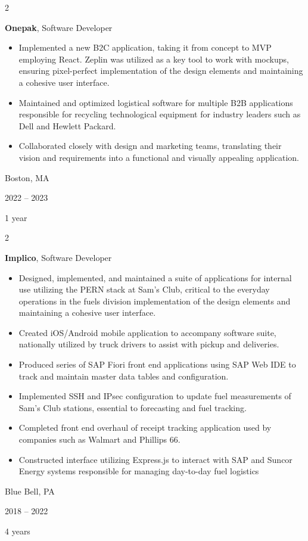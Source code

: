 \documentclass[10pt, letterpaper]{article}
\newenvironment{highlights}{
    \begin{itemize}[
        topsep=0.10 cm,
        parsep=0.10 cm,
        partopsep=0pt,
        itemsep=0pt,
        leftmargin=0.4 cm + 10pt
    ]
}{
    \end{itemize}
} %
\newenvironment{twocolentry}[2][]{
    \onecolentry
    \def\secondColumn{#2}
    \setcolumnwidth{\fill, 4.5 cm}
    \begin{paracol}{2}
}{
    \switchcolumn \raggedleft \secondColumn
    \end{paracol}
    \endonecolentry
} %
\begin{document}
        \begin{twocolentry}{
            Boston, MA

        2022 – 2023

        1 year
        }
            \textbf{Onepak}, Software Developer
            \begin{highlights}
                \item Implemented a new B2C application, taking it from concept to MVP employing React. Zeplin was utilized as a key tool to work with mockups, ensuring pixel-perfect implementation of the design elements and maintaining a cohesive user interface.
                \item Maintained and optimized logistical software for multiple B2B applications responsible for recycling technological equipment for industry leaders such as Dell and Hewlett Packard.
                \item Collaborated closely with design and marketing teams, translating their vision and requirements into a functional and visually appealing application.
            \end{highlights}
        \end{twocolentry}


        \vspace{0.2 cm}

        \begin{twocolentry}{
            Blue Bell, PA

        2018 – 2022

        4 years
        }
            \textbf{Implico}, Software Developer
            \begin{highlights}
                \item Designed, implemented, and maintained a suite of applications for internal use utilizing the PERN stack at Sam’s Club, critical to the everyday operations in the fuels division implementation of the design elements and maintaining a cohesive user interface.
                \item Created iOS/Android mobile application to accompany software suite, nationally utilized by truck drivers to assist with pickup and deliveries.
                \item Produced series of SAP Fiori front end applications using SAP Web IDE to track and maintain master data tables and configuration.
                \item Implemented SSH and IPsec configuration to update fuel measurements of Sam’s Club stations, essential to forecasting and fuel tracking.
                \item Completed front end overhaul of receipt tracking application used by companies such as Walmart and Phillips 66.
                \item Constructed interface utilizing Express.js to interact with SAP and Suncor Energy systems responsible for managing day-to-day fuel logistics
            \end{highlights}
        \end{twocolentry}
\end{document}
